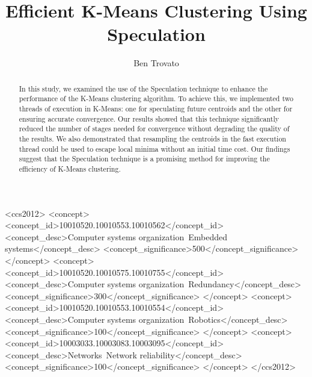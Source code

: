 \documentclass[sigplan, screen, nonacm = true]{acmart}
\begin{document}
\title{Efficient K-Means Clustering Using Speculation}

\author{Ben Trovato}





\renewcommand{\shortauthors}{Trovato and Tobin, et al.}


\begin{abstract}
In this study, we examined the use of the Speculation technique to enhance the performance of the K-Means clustering algorithm. To achieve this, we implemented two threads of execution in K-Means: one for speculating future centroids and the other for ensuring accurate convergence. Our results showed that this technique significantly reduced the number of stages needed for convergence without degrading the quality of the results. We also demonstrated that resampling the centroids in the fast execution thread could be used to escape local minima without an initial time cost. Our findings suggest that the Speculation technique is a promising method for improving the efficiency of K-Means clustering.
\end{abstract}

\begin{CCSXML}
<ccs2012>
 <concept>
  <concept_id>10010520.10010553.10010562</concept_id>
  <concept_desc>Computer systems organization~Embedded systems</concept_desc>
  <concept_significance>500</concept_significance>
 </concept>
 <concept>
  <concept_id>10010520.10010575.10010755</concept_id>
  <concept_desc>Computer systems organization~Redundancy</concept_desc>
  <concept_significance>300</concept_significance>
 </concept>
 <concept>
  <concept_id>10010520.10010553.10010554</concept_id>
  <concept_desc>Computer systems organization~Robotics</concept_desc>
  <concept_significance>100</concept_significance>
 </concept>
 <concept>
  <concept_id>10003033.10003083.10003095</concept_id>
  <concept_desc>Networks~Network reliability</concept_desc>
  <concept_significance>100</concept_significance>
 </concept>
</ccs2012>
\end{CCSXML}
\end{document}
